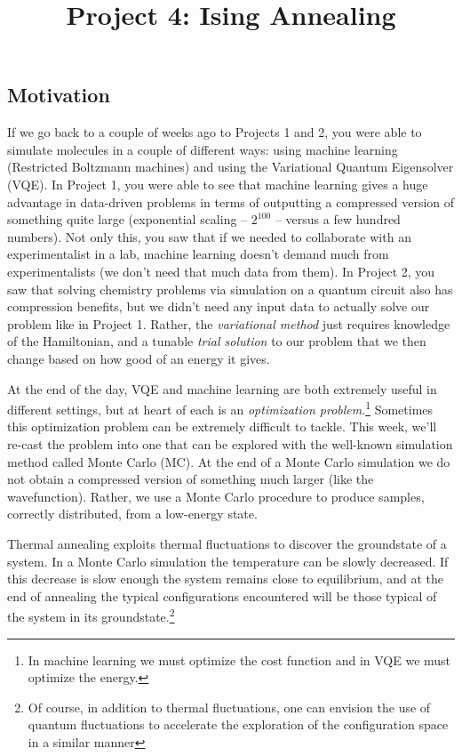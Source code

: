 \documentclass[12pt]{article}
\title{Project 4: Ising Annealing}
\begin{document}
\maketitle

\thispagestyle{empty}

\subsection*{Motivation}

If we go back to a couple of weeks ago to Projects 1 and 2, you were able to simulate molecules in a couple of different ways: using machine learning (Restricted Boltzmann machines) and using the Variational Quantum Eigensolver (VQE). In Project 1, you were able to see that machine learning gives a huge advantage in data-driven problems in terms of outputting a compressed version of something quite large (exponential scaling -- $2^{100}$ -- versus a few hundred numbers). Not only this, you saw that if we needed to collaborate with an experimentalist in a lab, machine learning doesn't  demand much from experimentalists (we don't need that much data from them). In Project 2, you saw that solving chemistry problems via simulation on a quantum circuit also has compression benefits, but we didn't need any input data to actually solve our problem like in Project 1. Rather, the {\it variational method} just requires knowledge of the Hamiltonian, and a tunable {\it trial solution} to our problem that we then change based on how good of an energy it gives.

At the end of the day, VQE and machine learning are both extremely useful in different settings, but at heart of each is an {\it optimization problem}.\footnote{In machine learning we must optimize the cost function and in VQE we must optimize the energy.} Sometimes this optimization problem can be extremely difficult to tackle. 
This week, we'll re-cast the problem into one that can be explored with the well-known simulation method called Monte Carlo (MC). 
At the end of a Monte Carlo simulation we do not obtain a compressed version of something much larger (like the wavefunction).
Rather, we use a Monte Carlo procedure to produce samples, correctly distributed, from a low-energy state.

Thermal annealing exploits thermal fluctuations to discover the groundstate of a system. In a Monte Carlo simulation the temperature can be slowly decreased. If this decrease is slow enough the system remains close to equilibrium, and at the end of annealing the typical configurations encountered will be those typical of the system in its groundstate.\footnote{Of course, in addition to thermal fluctuations, one can envision the use of quantum fluctuations to accelerate the exploration of the configuration space in a similar manner}
\end{document}

